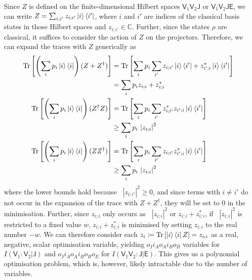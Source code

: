 \documentclass[10pt, a4paper]{article}
\numberwithin{equation}{section} %
\theoremstyle{definition}
\theoremstyle{plain}
\newcommand{\abs}[1]{\mathop{}\left\lvert#1\right\rvert}
\newcommand{\?}{\mathrel{?}} %
\newcommand{\C}{\mathbb{C}} %
\newcommand{\Tr}[2][]{\mathop{\mathrm{Tr}#1}\left[ #2 \right]} %
\newcommand{\crv}[1]{\mathsf{#1}}
\begin{document}
\begin{appendices}
                    Since \(Z\) is defined on the finite-dimensional Hilbert spaces \(\crv{V}_1\crv{V}_2\crv{J}\) or \(\crv{V}_1\crv{V}_2\crv{JE}\), we can write \(Z = \sum_{i,i'} z_{i;i'} \ket{i}\bra{i'}\), where \(i\) and \(i'\) are indices of the classical basis states in those Hilbert spaces and \(z_{i;i'} \in \C\). Further, since the states \(\rho\) are classical, it suffices to consider the action of \(Z\) on the projectors. Therefore, we can expand the traces with \(Z\) generically as
                    \begin{align}
                      \Tr{\left(\sum_i p_i \ket{i}\bra{i}\right) (Z + Z^{\dagger})} &= 
                      \Tr{ \sum_i p_i \sum_{i'} z_{i;i'} \ket{i}\bra{i'} + {z_{i';i}^*} \ket{i}\bra{i'} } \\
                                                                                               &= 
                                                                                               \sum_i p_i z_{i;i} + {z_{i;i}^*} \\
                      \Tr{\left(\sum_i p_i \ket{i}\bra{i}\right) (Z^{\dagger}Z)} &=
                      \Tr{ \sum_i p_i \sum_{i'} {z_{i;i'}^*} z_{i';i} \ket{i}\bra{i'} } \\
                                                                                            &\geq 
                                                                                            \sum_i p_i \abs{z_{i;i}}^2 \\
                      \Tr{\left(\sum_i p_i \ket{i}\bra{i}\right) (ZZ^{\dagger})} &= 
                      \Tr{ \sum_i p_i \sum_{i'} z_{i;i'} {z_{i';i}^*} \ket{i}\bra{i'} } \\
                                                                                            &\geq 
                                                                                            \sum_i p_i \abs{z_{i;i}}^2
                    \end{align}
                  where the lower bounds hold because \(\abs{z_{i;i'}}^2 \geq 0\), and since terms with \(i \neq i'\) do not occur in the expansion of the trace with \(Z + Z^{\dagger}\), they will be set to 0 in the minimisation. Further, since \(z_{i;i}\) only occurs as \(\abs{z_{i;i}}^2\) or \(z_{i;i} + {z_{i;i}^*}\), if \(\abs{z_{i;i}}^2\) is restricted to a fixed value \(w\), \(z_{i;i} + {z_{i;i}^*}\) is minimised by setting \(z_{i;i}\) to the real number \(-w\). We can therefore consider each \(z_i \coloneqq \Tr{\ket{i}\bra{i} Z} = z_{i;i}\) as a real, negative, scalar optimisation variable, yielding \(o_{\crv{J}} i_A o_A i_B o_B\) variables for \(I(\crv{V}_1 : \crv{V}_2|\crv{J})\) and \(o_{\crv{J}} i_A o_A i_B o_B o_E\) for \(I(\crv{V}_1\crv{V}_2 : \crv{J}|\crv{E})\). This gives us a polynomial optimisation problem, which is, however, likely intractable due to the number of variables.


\end{appendices}
\end{document}
